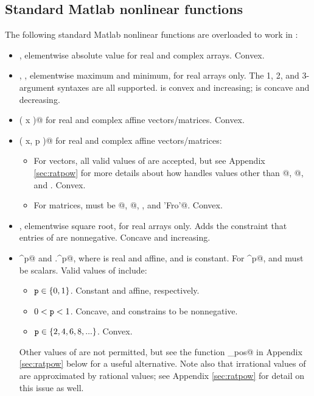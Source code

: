 \documentclass[12pt]{article}
\begin{document}
\subsection{Standard Matlab nonlinear functions}
\label{sec:nonl}

The following standard Matlab nonlinear functions 
are overloaded to work in \cvx:
\begin{itemize}
\item \verb@abs@, elementwise absolute value for real 
and complex arrays.
Convex.
\item \verb@max@, \verb@min@,
elementwise maximum and minimum, for real arrays only.
The 1, 2, and 3-argument syntaxes are all supported.
\verb@max@ is convex and increasing; \verb@min@ is concave and 
decreasing.
\item \verb@norm( x )@ for real and complex affine vectors/matrices.
Convex.
\item \verb@norm( x, p )@ for real and complex affine vectors/matrices:
\begin{itemize}
\item For vectors,
all valid values of \verb@p@ are accepted, but see
Appendix \ref{sec:ratpow} for more details about how \cvx
handles values other than @, @, and \verb@Inf@. Convex.
\item For matrices, \verb@p@ must be @, @, \verb@Inf@, and
\verb@'Fro'@. Convex.
\end{itemize}
\item \verb@sqrt@, elementwise square root, for real arrays only.
Adds the constraint that entries of \verb@x@ are nonnegative.
Concave and increasing.
\item \verb@x^p@ and \verb@x.^p@, where \verb@x@ is real and affine,
and \verb@p@ is constant. For \verb@x^p@, \verb@x@ and \verb@p@ must
be scalars. Valid values of \verb@p@ include:
\begin{itemize}
\item $\verb@p@ \in\{0,1\}$. Constant and affine, respectively.
\item $0<\verb@p@<1$. Concave, and constrains \verb@x@ to be nonnegative.
\item $\verb@p@\in\{2,4,6,8,...\}$. Convex.
\end{itemize}
Other values of \verb@p@ are not permitted, but see the function
\verb@pow_pos@ in Appendix \ref{sec:ratpow} below for a useful alternative.
Note also that irrational values of \verb@p@ are approximated
by rational values; see Appendix \ref{sec:ratpow} for detail on this issue as well.

\end{itemize}
\end{document}
